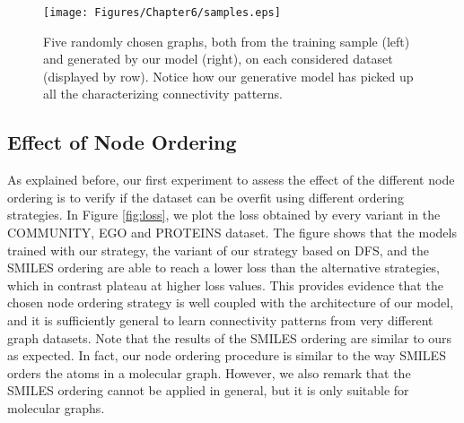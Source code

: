 \begin{figure}[h!]
\centering
\texttt{[image: Figures/Chapter6/samples.eps]}
\caption{Five randomly chosen graphs, both from the training sample (left) and generated by our model (right), on each considered dataset (displayed by row). Notice how our generative model has picked up all the characterizing connectivity patterns.}
\label{fig:samples}
\end{figure}

\subsection{Effect of Node Ordering}
As explained before, our first experiment to assess the effect of the different node ordering is to verify if the dataset can be overfit using different ordering strategies. In Figure \ref{fig:loss}, we plot the loss obtained by every variant in the COMMUNITY, EGO and PROTEINS dataset. The figure shows that the models trained with our strategy, the variant of our strategy based on DFS, and the SMILES ordering are able to reach a lower loss than the alternative strategies, which in contrast plateau at higher loss values. This provides evidence that the chosen node ordering strategy is well coupled with the architecture of our model, and it is sufficiently general to learn connectivity patterns from very different graph datasets. Note that the results of the SMILES ordering are similar to ours as expected. In fact, our node ordering procedure is similar to the way SMILES orders the atoms in a molecular graph. However, we also remark that the SMILES ordering cannot be applied in general, but it is only suitable for molecular graphs.


